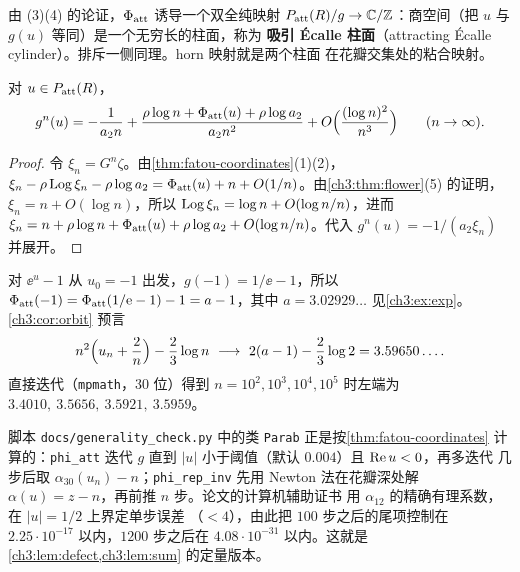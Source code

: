 \begin{remark}[Écalle 柱面]\label{ch3:rem:cylinder}
由 (3)(4) 的论证，$\Phi_{\mathrm{att}}$ 诱导一个双全纯映射
$P_{\mathrm{att}}(R)/g\to\mathbb{C}/\mathbb{Z}$：商空间（把 $u$ 与 $g(u)$ 等同）是一个无穷长的柱面，称为
\textbf{吸引 Écalle 柱面}（attracting Écalle cylinder）。排斥一侧同理。horn 映射就是两个柱面
在花瓣交集处的粘合映射。
\end{remark}

\begin{corollary}[轨道渐近]\label{ch3:cor:orbit}
对 $u\in P_{\mathrm{att}}(R)$，
\[
 g^n(u)=-\frac{1}{a_2n}+\frac{\rho\log n+\Phi_{\mathrm{att}}(u)+\rho\log a_2}{a_2n^2}
 +O\Bigl(\frac{(\log n)^2}{n^3}\Bigr)\qquad(n\to\infty).
\]
\end{corollary}

\begin{proof}
令 $\xi_n=G^n\zeta$。由\cref{thm:fatou-coordinates}(1)(2)，
$\xi_n-\rho\operatorname{Log}\xi_n-\rho\log a_2=\Phi_{\mathrm{att}}(u)+n+O(1/n)$。由\cref{ch3:thm:flower}(5) 的证明，
$\xi_n=n+O(\log n)$，所以 $\operatorname{Log}\xi_n=\log n+O(\log n/n)$，进而
$\xi_n=n+\rho\log n+\Phi_{\mathrm{att}}(u)+\rho\log a_2+O(\log n/n)$。代入 $g^n(u)=-1/(a_2\xi_n)$ 并展开。
\end{proof}

\begin{example}\label{ch3:ex:orbit}
对 $\ee^u-1$ 从 $u_0=-1$ 出发，$g(-1)=1/\ee-1$，所以
$\Phi_{\mathrm{att}}(-1)=\Phi_{\mathrm{att}}(1/\mathrm{e}-1)-1=a-1$，其中 $a=3.02929\ldots$ 见\cref{ch3:ex:exp}。
\cref{ch3:cor:orbit} 预言
\[
 n^2\Bigl(u_n+\frac2n\Bigr)-\frac23\log n\ \longrightarrow\ 2(a-1)-\frac23\log2=3.59650\ldots .
\]
直接迭代（\texttt{mpmath}，30 位）得到 $n=10^2,10^3,10^4,10^5$ 时左端为
$3.4010,\ 3.5656,\ 3.5921,\ 3.5959$。
\end{example}

\begin{remark}[数值计算]\label{ch3:rem:numerics}
脚本 \texttt{docs/generality\_check.py} 中的类 \texttt{Parab} 正是按\cref{thm:fatou-coordinates}
计算的：\texttt{phi\_att} 迭代 $g$ 直到 $|u|$ 小于阈值（默认 $0.004$）且 $\operatorname{Re} u<0$，再多迭代
几步后取 $\alpha_{30}(u_n)-n$；\texttt{phi\_rep\_inv} 先用 Newton 法在花瓣深处解
$\alpha(u)=z-n$，再前推 $n$ 步。论文的计算机辅助证书 \cite[附录 A]{KneserPaper} 用 $\alpha_{12}$ 的精确有理系数，在 $|u|=1/2$ 上界定单步误差
（$<4$），由此把 $100$ 步之后的尾项控制在 $2.25\cdot10^{-17}$ 以内，$1200$ 步之后在
$4.08\cdot10^{-31}$ 以内。这就是\cref{ch3:lem:defect,ch3:lem:sum} 的定量版本。
\end{remark}

